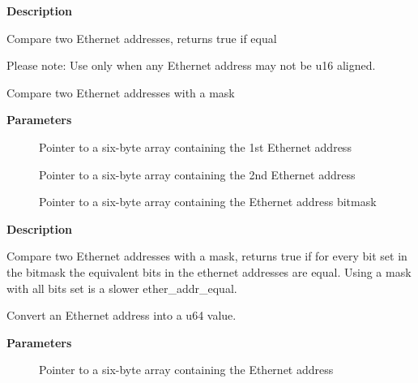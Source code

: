 \documentclass[a4paper,8pt,english]{sphinxmanual}
\begin{document}
\textbf{Description}

Compare two Ethernet addresses, returns true if equal

Please note: Use only when any Ethernet address may not be u16 aligned.

\begin{fulllineitems}
\label{networking/kapi:c.ether_addr_equal_masked}
Compare two Ethernet addresses with a mask

\end{fulllineitems}


\textbf{Parameters}
\begin{description}
\item[{}] \leavevmode
Pointer to a six-byte array containing the 1st Ethernet address

\item[{}] \leavevmode
Pointer to a six-byte array containing the 2nd Ethernet address

\item[{}] \leavevmode
Pointer to a six-byte array containing the Ethernet address bitmask

\end{description}

\textbf{Description}

Compare two Ethernet addresses with a mask, returns true if for every bit
set in the bitmask the equivalent bits in the ethernet addresses are equal.
Using a mask with all bits set is a slower ether\_addr\_equal.

\begin{fulllineitems}
\label{networking/kapi:c.ether_addr_to_u64}
Convert an Ethernet address into a u64 value.

\end{fulllineitems}


\textbf{Parameters}
\begin{description}
\item[{}] \leavevmode
Pointer to a six-byte array containing the Ethernet address

\end{description}
\end{document}

